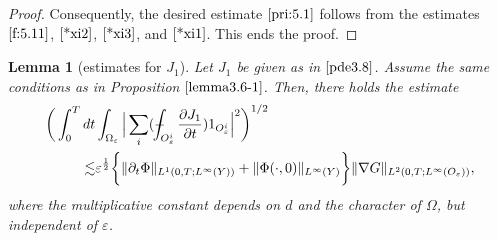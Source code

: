 \documentclass[13pt,CJK]{article}
\theoremstyle{plain}                       %
\newtheorem{lemma}{Lemma}[section]
\theoremstyle{remark}
\numberwithin{equation}{section}
\def\Xint#1{\mathchoice
  {\XXint\displaystyle\textstyle{#1}}%
  {\XXint\textstyle\scriptstyle{#1}}%
  {\XXint\scriptstyle\scriptscriptstyle{#1}}%
  {\XXint\scriptscriptstyle\scriptscriptstyle{#1}}%
  \!\int}
\def\XXint#1#2#3{{\setbox0=\hbox{$#1{#2#3}{\int}$}
  \vcenter{\hbox{$#2#3$}}\kern-.5\wd0}}
\def\dashint{\Xint-}
\begin{document}
\begin{proof}
Consequently, the desired estimate $\eqref{pri:5.1}$
follows from the estimates $\eqref{f:5.11}$, $\eqref{*xi2}$, $\eqref{*xi3}$,
and $\eqref{*xi1}$. This ends the proof.
\end{proof}



\medskip


\begin{lemma}[estimates for $J_1$]\label{*lemma4.1}
Let $J_1$ be given as in $\eqref{pde3.8}$. Assume the same conditions as in
Proposition $\ref{lemma3.6-1}$. Then, there holds
the estimate
\begin{equation}\label{pri:5.0}
\begin{aligned}
\bigg(\int_{0}^{T}dt
&\int_{\Omega_{\varepsilon}}\Big|
\sum_{i}(\dashint_{O_{\varepsilon}^i}\frac{\partial J_1}{\partial t}) 1_{O_{\varepsilon}^i}\Big|^2
\bigg)^{1/2} \\
\lesssim
&\varepsilon^{\frac{1}{2}}
\bigg\{\|\partial_t \Phi\|_{L^1(0,T;L^{\infty}(Y))}+
\|\Phi(\cdot,0)\|_{L^{\infty}(Y)}
\bigg\}\|\nabla G\|_{L^2(0,T;L^{\infty}
(O_\varepsilon))},
\end{aligned}
\end{equation}
where the multiplicative constant depends on $d$ and the character of $\Omega$, but independent of $\varepsilon$.
\end{lemma}
\end{document}
